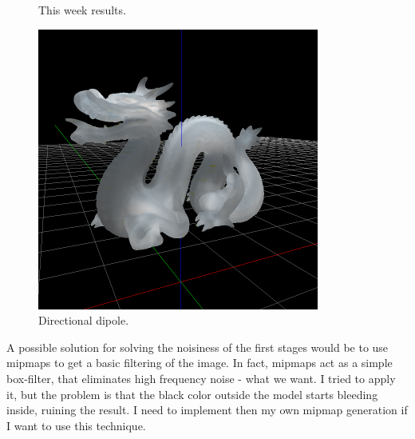 \documentclass[12pt, twoside,a4paper]{article}
\begin{document}
\begin{figure}[!ht]
{  \label{fig:ss3}
} 
\caption{This week results.}
\end{figure}

\clearpage

\begin{figure}[!h]
\centering
\includegraphics[width=350px]{jeppe_120_100_frames.png}
\caption{Directional dipole.}
\end{figure}

\clearpage
A possible solution for solving the noisiness of the first stages would be to use mipmaps to get a basic filtering of the image. In fact, mipmaps act as a simple box-filter, that eliminates high frequency noise - what we want. I tried to apply it, but the problem is that the black color outside the model starts bleeding inside, ruining the result. I need to implement then my own mipmap generation if I want to use this technique.
\end{document}
